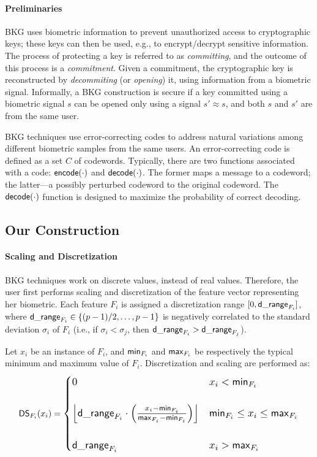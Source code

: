 \paragraph{Preliminaries}
BKG uses  biometric information to prevent unauthorized access to cryptographic keys; these keys can then be used, e.g., to encrypt/decrypt sensitive information. The process of protecting a key is referred to as {\em 
committing}, and the outcome of this process is a {\em commitment}. Given a 
commitment, the cryptographic key is reconstructed by {\em decommiting} (or {\em 
opening}) it, using information from a biometric signal. 
Informally, a BKG construction is secure if a key committed using a biometric signal $s$ can be opened only using a signal $s'\approx s$, and both $s$ and $s'$ are from the same user. 

BKG techniques use error-correcting codes to address natural variations among 
different biometric samples from the same users.  An error-correcting code is 
defined as a set $C$ of codewords. Typically, there are two functions associated 
with a code: ${\sf encode(\cdot)}$ and ${\sf decode(\cdot)}$. The former maps a 
message to a codeword; the latter---a possibly perturbed codeword to the original 
codeword. 
The ${\sf decode(\cdot)}$ function is designed to maximize the probability of 
correct decoding. 

\subsection{Our Construction}
\paragraph{Scaling and Discretization}
BKG techniques work on discrete values, instead of real values. Therefore, the 
user first performs scaling and discretization of the feature vector representing 
her biometric.
Each feature $F_i$ is assigned a discretization range $[0, {\sf d\_range}_{F_i}]$, where ${\sf d\_range}_{F_i} \in \{(p-1)/2,\ldots, p-1\}$ is negatively correlated to the standard deviation $\sigma_i$ of $F_i$ (i.e., if $\sigma_i < \sigma_j$, then ${\sf d\_range}_{F_i} > {\sf d\_range}_{F_j}$).

Let $x_{i}$ be an instance of ${F_i}$, and ${\sf min}_{F_i}$ and ${\sf max}_{F_i}$ be respectively the typical minimum and maximum value of ${F_i}$. Discretization and scaling are performed as:
%
\[\small
{\sf DS}_{{{F_i}}}(x_i) = 
\resizebox{0.8\linewidth}{!}{$
\begin{cases}
0 & x_i<{\sf min}_{F_i} \\ \\
\left\lfloor {\sf d\_range}_{F_i}\cdot\left(\frac{ x_i-{\sf min}_{F_i}}{{\sf max}_{F_i}-{\sf min}_{F_i}}\right)\right\rfloor & {\sf min}_{F_i} \leq x_i \leq {\sf max}_{F_i} \\ \\
{\sf d\_range}_{F_i} & x_i>{\sf max}_{F_i} \\
\end{cases}$}
\]
%


